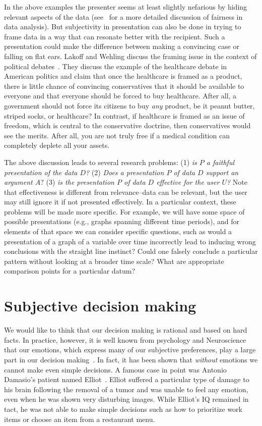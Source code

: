 \documentclass[11pt]{article}
\begin{document}
In the above examples the presenter seems at least slightly nefarious by hiding relevant aspects of the data (see~\cite{DBLP:conf/edbt/StoyanovichAM16} for a more detailed discussion of fairness in data analysis). But subjectivity in presentation can also be done in trying to frame data in a way that can resonate better with the recipient. Such a presentation could make the difference between making a convincing case or falling on flat ears. Lakoff and Wehling discuss the framing issue  in the context of political debates~\cite{lakoff-book}. They discuss the example of the healthcare debate in American politics and claim that once the healthcare is framed as a product, there is little chance of convincing conservatives that it should be available to everyone and that everyone should be forced to buy healthcare. After all, a government should not force its citizens to buy {\em any} product, be it peanut butter, striped socks, or healthcare? In contrast, if healthcare is framed as an issue of freedom, which is central to the conservative doctrine, then conservatives would see the merits. After all, you are not truly free if a medical condition can completely deplete all your assets.   

The above discussion leads to several research problems: 
(1) {\em is $P$ a faithful presentation of the data $D$?} (2) {\em Does a presentation $P$ of data $D$ support an argument $A$}?  (3) {\em is the presentation $P$ of data $D$ effective for the user $U$?} Note that effectiveness is different from relevance--data can be relevant, but the user may still ignore it if not presented effectively. In a particular context, these problems will be made more specific. For example, we will have some space of possible presentations (e.g., graphs spanning different time periods), and for elements of that space we can consider specific questions, such as would a presentation of a graph of a variable over time incorrectly lead to inducing wrong conclusions with the straight line instinct? Could one falsely conclude a particular pattern without looking at a broader time scale?  What are appropriate comparison points for a particular datum? 

\section{Subjective decision making}
We would like to think that our decision making is rational and based on hard facts. In practice, however, it is well known from psychology and Neuroscience that our emotions, which express many of our subjective preferences, play a large part in our decision making~\cite{kahneman}. In fact, it has been shown that {\em without} emotions we cannot make even simple decisions. A famous case in point was Antonio Damasio's patient named Elliot~\cite{damasio}. Elliot suffered a particular type of damage to his brain following the removal of a tumor and was unable to feel any emotion, even when he was shown very disturbing images. While Elliot's IQ remained in tact, he was not able to make simple decisions such as how to prioritize work items or choose an item from a restaurant menu.
\end{document}
